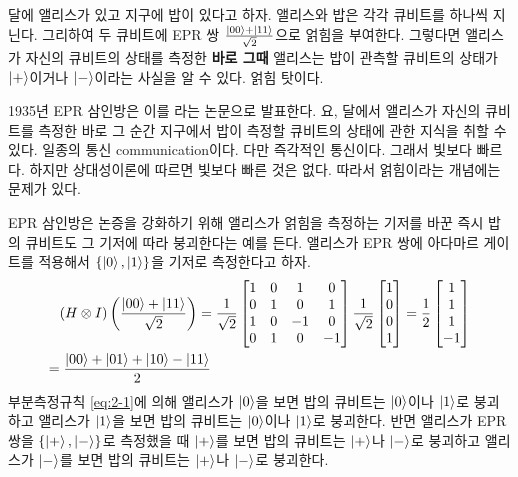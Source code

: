 \documentclass[a4paper,chapter,atbegshi]{oblivoir}
\begin{document}
\begin{mdframed}
달에 앨리스가 있고 지구에 밥이 있다고 하자. 앨리스와 밥은 각각 큐비트를
하나씩 지닌다. 그리하여 두 큐비트에 EPR 쌍 $\frac{\ket{00}+\ket{11}}{\sqrt2}$으로
얽힘을 부여한다. 그렇다면 앨리스가 자신의 큐비트의 상태를 측정한
\textbf{바로 그때} 앨리스는 밥이 관측할 큐비트의 상태가 $\ket{+}$이거나
$\ket{-}$이라는 사실을 알 수 있다. 얽힘 탓이다.
\end{mdframed}

1935년 EPR 삼인방은 이를 라는 논문으로 발표한다. 요,
달에서 앨리스가 자신의 큐비트를 측정한 바로 그 순간 지구에서 밥이
측정할 큐비트의 상태에 관한 지식을 취할 수 있다. 일종의 통신{\tiny 
communication}이다. 다만 즉각적인 통신이다. 그래서 빛보다 빠르다. 
하지만 상대성이론에 따르면 빛보다 빠른 것은 없다. 따라서 얽힘이라는
개념에는 문제가 있다.

EPR 삼인방은 논증을 강화하기 위해 앨리스가 얽힘을 측정하는 기저를 바꾼
즉시 밥의 큐비트도 그 기저에 따라 붕괴한다는 예를 든다. 앨리스가 EPR 쌍에
아다마르 게이트를 적용해서 $\{\ket0,\ket1\}$을 기저로 측정한다고 하자.
\begin{align*}
  &(H\otimes I)\left(\frac{\ket{00}+\ket{11}}{\sqrt2}\right)
  =\frac{1}{\sqrt2}
  \begin{bmatrix}
    1&0&1&0 \\ 0&1&0&1 \\ 1&0&-1&0 \\0&1&0&-1
  \end{bmatrix}
  \frac{1}{\sqrt2}\begin{bmatrix}1\\0\\0\\1\end{bmatrix}
  =
  \frac{1}{2}\begin{bmatrix}1\\1\\1\\-1\end{bmatrix}\\=&\;
  \frac{\ket{00}+\ket{01}+\ket{10}-\ket{11}}{2} 
\end{align*}
부분측정규칙 \ref{eq:2-1}에 의해 앨리스가 $\ket0$을 보면 밥의 큐비트는
$\ket0$이나 $\ket1$로 붕괴하고 앨리스가 $\ket1$을 보면 밥의 큐비트는 
$\ket0$이나 $\ket1$로 붕괴한다. 반면 앨리스가 EPR 쌍을 $\{\ket+,\ket-\}$로
측정했을 때 $\ket+$를 보면 밥의 큐비트는 $\ket+$나 $\ket-$로 붕괴하고
앨리스가 $\ket-$를 보면 밥의 큐비트는 $\ket+$나 $\ket-$로 붕괴한다.
\end{document}

